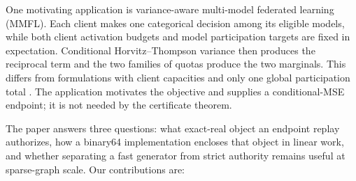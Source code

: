 \documentclass[smallextended,envcountsect]{svjour3}
\begin{document}
One motivating application is variance-aware multi-model federated learning
(MMFL).  Each client makes one categorical decision among its eligible models,
while both client activation budgets and model participation targets are fixed
in expectation.  Conditional Horvitz--Thompson variance then produces the
reciprocal term and the two families of quotas produce the two marginals.  This
differs from formulations with client capacities and only one global
participation total \citep{zhang2025optimal}.  The application motivates the
objective and supplies a conditional-MSE endpoint; it is not needed by the
certificate theorem.

The paper answers three questions: what exact-real object an endpoint replay
authorizes, how a binary64 implementation encloses that object in linear work,
and whether separating a fast generator from strict authority remains useful at
sparse-graph scale.  Our contributions are:
\end{document}
